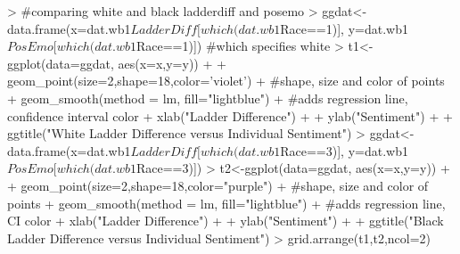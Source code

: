 \documentclass{article}
\begin{document}
\begin{enumerate}
\begin{Schunk}
\begin{Sinput}
> #comparing white and black ladderdiff and posemo
> ggdat<-data.frame(x=dat.wb1$LadderDiff[which(dat.wb1$Race==1)], y=dat.wb1$PosEmo[which(dat.wb1$Race==1)]) #which specifies white
> t1<-ggplot(data=ggdat, aes(x=x,y=y)) +
+   geom_point(size=2,shape=18,color='violet') + #shape, size and color of points
+   geom_smooth(method = lm, fill="lightblue") + #adds regression line, confidence interval color
+   xlab("Ladder Difference") +
+   ylab("Sentiment") +
+   ggtitle("White Ladder Difference versus Individual Sentiment")
> ggdat<-data.frame(x=dat.wb1$LadderDiff[which(dat.wb1$Race==3)], y=dat.wb1$PosEmo[which(dat.wb1$Race==3)])
> t2<-ggplot(data=ggdat, aes(x=x,y=y)) +
+   geom_point(size=2,shape=18,color="purple") + #shape, size and color of points
+   geom_smooth(method = lm, fill="lightblue") + #adds regression line, CI color
+   xlab("Ladder Difference") +
+   ylab("Sentiment") +
+   ggtitle("Black Ladder Difference versus Individual Sentiment")
> grid.arrange(t1,t2,ncol=2)
\end{Sinput}
\end{Schunk}


\end{enumerate}
\end{document}
